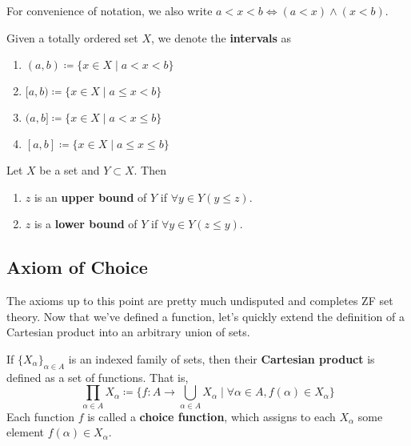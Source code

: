   For convenience of notation, we also write $a < x < b \iff (a < x) \land (x < b)$. 

  \begin{definition}[Interval]
    Given a totally ordered set $X$, we denote the \textbf{intervals} as 
    \begin{enumerate}
      \item $(a, b) \coloneqq \{x \in X \mid a < x < b \}$
      \item $[a, b) \coloneqq \{x \in X \mid a \leq x < b \}$
      \item $(a, b] \coloneqq \{x \in X \mid a < x \leq b \}$
      \item $[a, b] \coloneqq \{x \in X \mid a \leq x \leq b \}$
    \end{enumerate}
  \end{definition} 

  \begin{definition}[Bounds]
    Let $X$ be a set and $Y \subset X$. Then 
    \begin{enumerate}
      \item $z$ is an \textbf{upper bound} of $Y$ if $\forall y \in Y (y \leq z)$. 
      \item $z$ is a \textbf{lower bound} of $Y$ if $\forall y \in Y (z \leq y)$. 
    \end{enumerate}
  \end{definition}

\subsection{Axiom of Choice}

  The axioms up to this point are pretty much undisputed and completes ZF set theory. Now that we've defined a function, let's quickly extend the definition of a Cartesian product into an arbitrary union of sets. 
  
  \begin{definition}
    If $\{X_\alpha\}_{\alpha \in A}$ is an indexed family of sets, then their \textbf{Cartesian product} is defined as a set of functions. That is, 
    \begin{equation}
      \prod_{\alpha \in A} X_\alpha \coloneqq \bigg\{ f: A \rightarrow \bigcup_{\alpha \in A} X_\alpha \;\Big|\; \forall \alpha \in A, f(\alpha) \in X_\alpha \bigg\} 
    \end{equation}
    Each function $f$ is called a \textbf{choice function}, which assigns to each $X_\alpha$ some element $f(\alpha) \in X_\alpha$. 
  \end{definition} 

